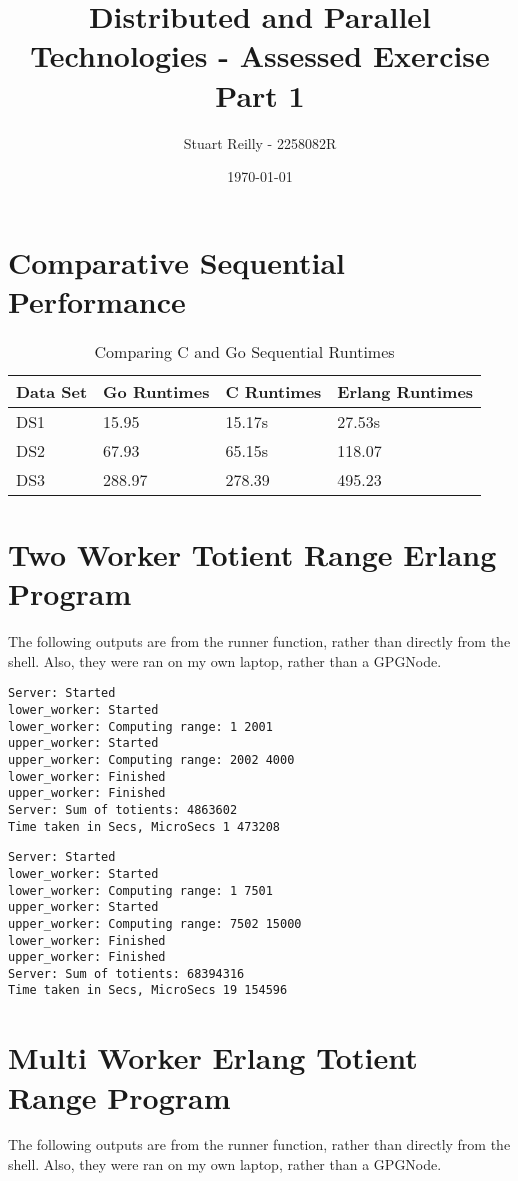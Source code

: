 \documentclass[11pt,a4paper,titlepage]{article}
\begin{document}
\title{Distributed and Parallel Technologies - Assessed Exercise Part 1}
\author{Stuart Reilly - 2258082R}
\date{\today}
\maketitle

\section{Comparative Sequential Performance}

\begin{table}[h]
	\centering
	\begin{tabular}{|l|l|l|l|}
		\hline
		Data Set & Go Runtimes & C Runtimes & Erlang Runtimes \\ \hline
		DS1 & 15.95 & 15.17s & 27.53s \\ \hline
		DS2 & 67.93 & 65.15s & 118.07 \\ \hline
		DS3 & 288.97 & 278.39 & 495.23 \\ \hline
	\end{tabular}
	\caption{Comparing C and Go Sequential Runtimes}
\end{table}

\section{Two Worker Totient Range Erlang Program}
The following outputs are from the runner function, rather than directly from the shell.
Also, they were ran on my own laptop, rather than a GPGNode.

\begin{verbatim}
Server: Started
lower_worker: Started
lower_worker: Computing range: 1 2001
upper_worker: Started
upper_worker: Computing range: 2002 4000
lower_worker: Finished
upper_worker: Finished
Server: Sum of totients: 4863602
Time taken in Secs, MicroSecs 1 473208
\end{verbatim}

\begin{verbatim}
Server: Started
lower_worker: Started
lower_worker: Computing range: 1 7501
upper_worker: Started
upper_worker: Computing range: 7502 15000
lower_worker: Finished
upper_worker: Finished
Server: Sum of totients: 68394316
Time taken in Secs, MicroSecs 19 154596
\end{verbatim}

\section{Multi Worker Erlang Totient Range Program}
The following outputs are from the runner function, rather than directly from the shell.
Also, they were ran on my own laptop, rather than a GPGNode.
\end{document}
